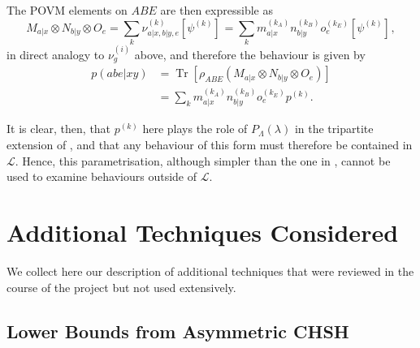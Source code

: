 \documentclass[10pt, a4paper]{article}
\numberwithin{equation}{section} %
\theoremstyle{definition}
\theoremstyle{plain}
\newcommand{\?}{\mathrel{?}} %
\newcommand{\Tr}[2][]{\mathop{\mathrm{Tr}#1}\left[ #2 \right]} %
\newcommand{\proj}[2][]{{[#2]}_{#1}}
\newcommand{\Ls}{\mathcal{L}}
\begin{document}
\begin{appendices}
                      The POVM elements on \(ABE\) are then expressible as
                      \begin{equation}
                        M_{a|x} \otimes N_{b|y} \otimes O_e = \sum_k \nu^{(k)}_{a|x,b|y,e} \proj{\psi^{(k)}} = \sum_k m_{a|x}^{(k_A)} n_{b|y}^{(k_B)} o_e^{(k_E)} \proj{\psi^{(k)}},
                      \end{equation}
                      in direct analogy to \(\nu_{g}^{(i)}\) above, and therefore the behaviour is given by
                      \begin{align}
                        p(abe|xy) &= \Tr{\rho_{ABE} \left(M_{a|x} \otimes N_{b|y} \otimes O_e\right)} \\
                                  &= \sum_k m_{a|x}^{(k_A)} n_{b|y}^{(k_B)} o_e^{(k_E)} p^{(k)}.
                      \end{align}

                      It is clear, then, that \(p^{(k)}\) here plays the role of \(P_{\Lambda}(\lambda)\) in the tripartite extension of , and that any behaviour of this form must therefore be contained in \(\Ls\). Hence, this parametrisation, although simpler than the one in , cannot be used to examine behaviours outside of \(\Ls\).

                      \section{Additional Techniques Considered}\label{sec:addtech}

                      We collect here our description of additional techniques that were reviewed in the course of the project but not used extensively.

                      \subsection{Lower Bounds from Asymmetric CHSH}


\end{appendices}
\end{document}
